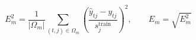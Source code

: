 \documentclass{article}
\begin{document}
\fontsize{22}{29}\selectfont
\[
E_m^2=\frac{1}{|\Omega_m|}\sum_{(t,j)\in\Omega_m}\left(\frac{\widehat y_{tj}-y_{tj}}{s_j^{\mathrm{train}}}\right)^2,\qquad E_m=\sqrt{E_m^2}
\]
\end{document}
